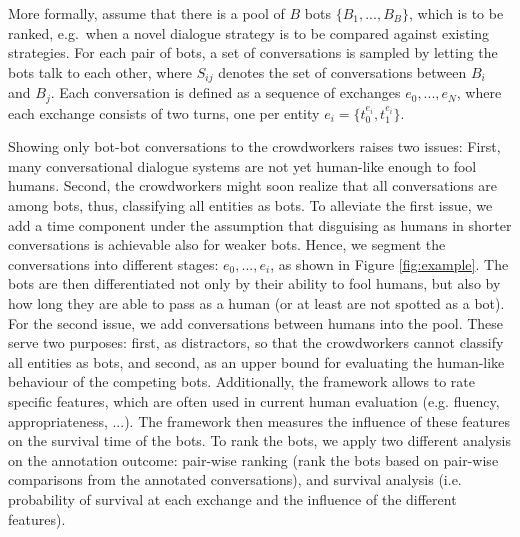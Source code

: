 More formally, assume that there is a pool of $B$ bots $\{B_1, ..., B_B\}$, which is to be ranked, e.g.\ when a novel dialogue strategy is to be compared against existing strategies. For each pair of bots, a set of conversations is sampled by letting the bots talk to each other, where $S_{ij}$ denotes the set of conversations between $B_i$ and $B_j$. Each conversation is defined as a sequence of exchanges $e_0, ..., e_N$, where each exchange consists of two turns, one per entity $e_i = \{t_0^{e_i}, t_1^{e_i}\}$.

Showing only bot-bot conversations to the crowdworkers raises two issues: First, many conversational dialogue systems are not yet human-like enough to fool humans. Second, the crowdworkers might soon realize that all conversations are among bots, thus, classifying all entities as bots. 
To alleviate the first issue, we add a time component under the assumption that disguising as humans in shorter conversations is achievable also for weaker bots. Hence, we segment the conversations into different stages: $e_0, ..., e_i$, as shown in Figure \ref{fig:example}. The bots are then differentiated not only by their ability to fool humans, but also by how long they are able to pass as a human (or at least are not spotted as a bot). For the second issue, we add conversations between humans into the pool. These serve two purposes: first, as distractors, so that the crowdworkers cannot classify all entities as bots, and second, as an upper bound for evaluating the human-like behaviour of the competing bots.
Additionally, the framework allows to rate specific features, which are often used in current human evaluation (e.g. fluency, appropriateness, ...). The framework then measures the influence of these features on the survival time of the bots. 
To rank the bots, we apply two different analysis on the annotation outcome: pair-wise ranking (rank the bots based on pair-wise comparisons from the annotated conversations), and survival analysis (i.e. probability of survival at each exchange and the influence of the different features).

